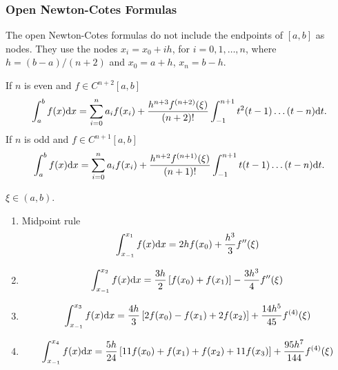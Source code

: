 \subsubsection{Open Newton-Cotes Formulas}
The open Newton-Cotes formulas do not include the endpoints of $[a,b]$ as nodes. They use the nodes $x_i=x_0+ih$, for $i=0,1,\ldots,n$, where $h=(b-a)/(n+2)$ and $x_0=a+h$, $x_n=b-h$.
\begin{theo}
If $n$ is even and $f\in C^{n+2}[a,b]$
\[
\int_a^bf(x)\mathrm{d} x=\sum_{i=0}^na_if(x_i)+\frac{h^{n+3}f^{(n+2)}(\xi)}{(n+2)!}\int_{-1}^{n+1}t^2(t-1)\ldots(t-n)\mathrm{d} t.
\]
If $n$ is odd and $f\in C^{n+1}[a,b]$
\[
\int_a^bf(x)\mathrm{d} x=\sum_{i=0}^na_if(x_i)+\frac{h^{n+2}f^{(n+1)}(\xi)}{(n+1)!}\int_{-1}^{n+1}t(t-1)\ldots(t-n)\mathrm{d} t.
\]

$\xi\in(a,b)$.
\end{theo}

\begin{enumerate}[n=1]\addtocounter{enumi}{-1}
    \item Midpoint rule
        \begin{align*}
        \int_{x_{-1}}^{x_1}f(x)\mathrm{d} x=2hf(x_0)+\frac{h^3}{3}f''(\xi)
        \end{align*}
    \item \phantom{Unknown Name}
        \begin{align*}
        \int_{x_{-1}}^{x_2}f(x)\mathrm{d} x=\frac{3h}{2}\left[f(x_0)+f(x_1)\right]-\frac{3h^3}{4}f''(\xi)
        \end{align*}
    \item \phantom{Unknown Name}
        \begin{align*}
        \int_{x_{-1}}^{x_3}f(x)\mathrm{d} x=\frac{4h}{3}\left[2f(x_0)-f(x_1)+2f(x_2)\right]+\frac{14h^5}{45}f^{(4)}(\xi)
        \end{align*}
    \item \phantom{Unknown Name}
        \begin{align*}
        \int_{x_{-1}}^{x_4}f(x)\mathrm{d} x=\frac{5h}{24}\left[11f(x_0)+f(x_1)+f(x_2)+11f(x_3)\right]+\frac{95h^7}{144}f^{(4)}(\xi)
        \end{align*}
\end{enumerate}
